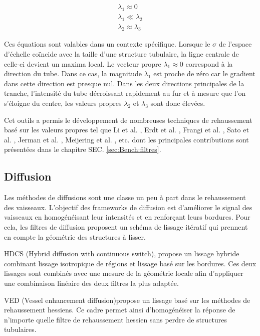 \begin{align}
  \lambda_1 \approx 0 \\
  \lambda_1 \ll \lambda_2 \\
  \lambda_2 \approx \lambda_3
\end{align}

Ces équations sont valables dans un contexte spécifique. Lorsque le $\sigma$ de l'espace d'échelle coïncide avec la taille d'une structure tubulaire, la ligne centrale de celle-ci devient un maxima local. Le vecteur propre $\lambda_1 \approx 0$ correspond à la direction du tube. Dans ce cas, la magnitude $\lambda_1$ est proche de zéro car le gradient dans cette direction est presque nul. Dans les deux directions principales de la tranche, l'intensité du tube décroissant rapidement au fur et à mesure que l'on s'éloigne du centre, les valeurs propres $\lambda_2$ et $\lambda_3$ sont donc élevées.

Cet outils a permis le développement de nombreuses techniques de rehaussement basé sur les valeurs propres tel que Li et al. \cite{Li2003_vesselness}, Erdt et al. \cite{Erdt2008_liver_vesselness}, Frangi et al. \cite{Frangi1998_vesselness}, Sato et al. \cite{Sato1998_vesselness}, Jerman et al. \cite{Jerman2015_beyond_frangi}, Meijering et al. \cite{Meijering2004_neurite_vesselness}, etc. dont les principales contributions sont présentées dans le chapitre SEC. \ref{sec:Bench:filtres}.

\subsection{Diffusion}
\label{sec:EA:rehaussement:diffusion}

Les méthodes de diffusions sont une classe un peu à part dans le rehaussement des vaisseaux. L'objectif des frameworks de diffusion est d'améliorer le signal des vaisseaux en homogénéisant leur intensités et en renforçant leurs bordures. Pour cela, les filtres de diffusion proposent un schéma de lissage itératif qui prennent en compte la géométrie des structures à lisser.

HDCS \cite{Mendrik2009_HDCS} (Hybrid diffusion with continuous switch), propose un lissage hybride combinant lissage isotropique de régions et lissage basé sur les bordures. Ces deux lissages sont combinés avec une mesure de la géométrie locale afin d'appliquer une combinaison linéaire des deux filtres la plus adaptée.

VED \cite{Manniesing2006_VED} (Vessel enhancement diffusion)propose un lissage basé sur les méthodes de rehaussement hessiens. Ce cadre permet ainsi d'homogénéiser la réponse de n'importe quelle filtre de rehaussement hessien sans perdre de structures tubulaires.

